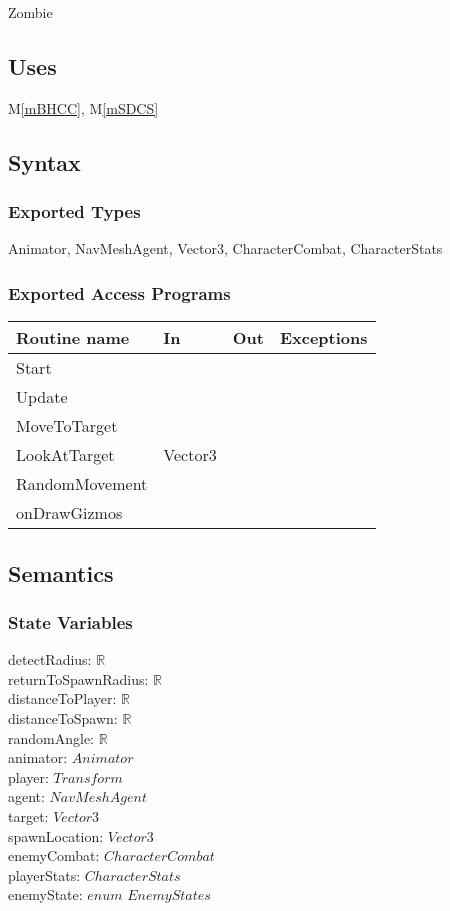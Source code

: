 \documentclass[12pt]{article}
\newcommand{\mref}[1]{M\ref{#1}}
\begin{document}
Zombie

\subsection* {Uses}

\mref{mBHCC}, \mref{mSDCS}

\subsection* {Syntax}

\subsubsection* {Exported Types}

Animator, NavMeshAgent, Vector3, CharacterCombat, CharacterStats

\subsubsection* {Exported Access Programs}

\begin{tabular}{| l | l | l | l |}
\hline
\textbf{Routine name} & \textbf{In} & \textbf{Out} & \textbf{Exceptions}\\
\hline
Start & ~  & ~ & ~\\
Update & ~  & ~ & ~\\
MoveToTarget & ~  & ~ & ~\\
LookAtTarget & Vector3  & ~ & ~\\
RandomMovement & ~  & ~ & ~\\
onDrawGizmos & ~  & ~ & ~\\
\hline
\end{tabular}

\subsection* {Semantics}

\subsubsection* {State Variables}

detectRadius: $\mathbb{R}$ \\
returnToSpawnRadius: $\mathbb{R}$ \\
distanceToPlayer: $\mathbb{R}$ \\
distanceToSpawn: $\mathbb{R}$ \\
randomAngle: $\mathbb{R}$ \\
animator: $Animator$ \\
player: $Transform$ \\
agent: $NavMeshAgent$ \\
target: $Vector3$ \\
spawnLocation: $Vector3$ \\
enemyCombat: $CharacterCombat$ \\
playerStats: $CharacterStats$ \\
enemyState: $enum$ $EnemyStates$ 
\end{document}
